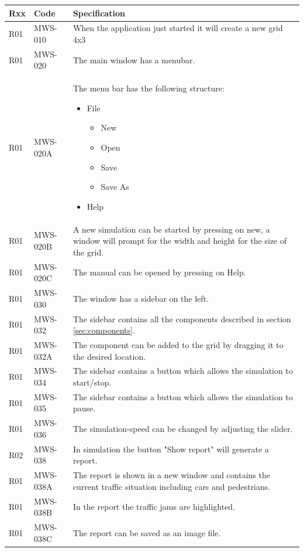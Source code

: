 \begin{tabularx}{\textwidth}{|p{0.5cm}p{2cm}X|}\hline
	Rxx & Code & Specification \\\hline
	R01 & MWS-010 & When the application just started it will create a new grid 4x3\\\hline
	R01 & MWS-020 & The main window has a menubar.\\\hline
	R01 & MWS-020A & The menu bar has the following structure:
	\begin{itemize}[noitemsep,nolistsep]
		\item File
		\begin{itemize}
			\item New
			\item Open
			\item Save
			\item Save As
		\end{itemize}
		\item Help
	\end{itemize}\\\hline
	R01 & MWS-020B & A new simulation can be started by pressing on new, a window will prompt for the width and height for the size of the grid.\\\hline
	R01 & MWS-020C & The manual can be opened by pressing on Help.\\\hline
	R01 & MWS-030 & The window has a sidebar on the left.\\\hline
	R01 & MWS-032 & The sidebar contains all the components described in section \ref*{sec:components}.\\\hline
	R01 & MWS-032A & The component can be added to the grid by dragging it to the desired location.\\\hline
	R01 & MWS-034 & The sidebar contains a button which allows the simulation to start/stop.\\\hline
	R01 & MWS-035 & The sidebar contains a button which allows the simulation to pause.\\\hline
	R01 & MWS-036 & The simulation-speed can be changed by adjusting the slider.\\\hline
	R02 & MWS-038 & In simulation the button "Show report" will generate a report.\\\hline
	R01 & MWS-038A & The report is shown in a new window and contains the current traffic situation including cars and pedestrians.\\\hline
	R01 & MWS-038B & In the report the traffic jams are highlighted.\\\hline
	R01 & MWS-038C & The report can be saved as an image file.\\\hline
\end{tabularx}

